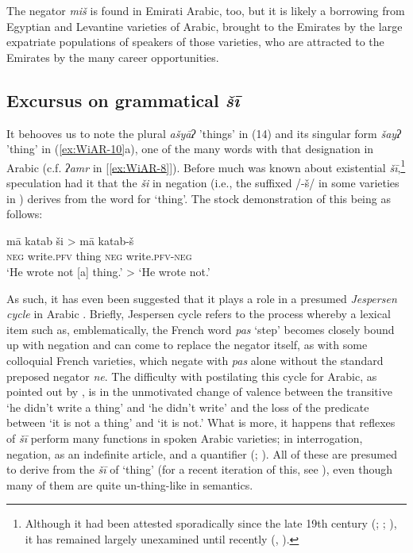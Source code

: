 \documentclass[output=paper,colorlinks,citecolor=brown]{langscibook}
\begin{document}
The negator \textit{miš} is found in Emirati Arabic, too, but it is likely a borrowing from Egyptian and Levantine varieties of Arabic, brought to the Emirates by the large expatriate populations of speakers of those varieties, who are attracted to the Emirates by the many career opportunities.

\subsection{Excursus on grammatical \textit{šī}} \label{s:WiAR-3.3}

It behooves us to note the plural \textit{ašyāʔ} ’things’ in (14) and its singular form \textit{šayʔ} ’thing’ in (\ref{ex:WiAR-10}a), one of the many words with that designation in Arabic (c.f. \textit{ʔamr} in [\ref{ex:WiAR-8}]). Before much was known about existential \textit{šī},\footnote{Although it had been attested sporadically since the late 19th century  (\citealp[112]{reinhardt1894a}; \citealp[170]{johnstone1967a}; \citealp[24]{brockett1985a}), it has remained largely unexamined until recently (\citealp[24--28]{holes2016a}, \citealp{wilmsen2017a, wilmsen2020a}).} speculation had it that the \textit{ši} in negation (i.e., the suffixed /-š/ in some varieties in ) derives from the word for ‘thing’. The stock demonstration of this being as follows:


\ea \label{ex:WiAR-17}
	\gll mā katab ši > mā katab-š\\
	\textsc{neg} write.\textsc{pfv} thing {} \textsc{neg} write.\textsc{pfv-neg}\\
	\glt ‘He wrote not [a] thing.’ > ‘He wrote not.’
\z

As such, it has even been suggested that it plays a role in a presumed \textit{Jespersen cycle} in Arabic \citep{lucas2007a}. Briefly, Jespersen cycle refers to the process whereby a lexical item such as, emblematically, the French word \textit{pas} ‘step’ becomes closely bound up with negation and can come to replace the negator itself, as with some colloquial French varieties, which negate with \textit{pas} alone without the standard preposed negator \textit{ne}. The difficulty with postilating this cycle for Arabic, as pointed out by \citet[139]{woidich1990a}, is in the unmotivated change of valence between the transitive ‘he didn’t write a thing’ and ‘he didn’t write’ and the loss of the predicate between ‘it is not a thing’ and ‘it is not.’ What is more, it happens that reflexes of \textit{šī} perform many functions in spoken Arabic varieties; in interrogation, negation, as an indefinite article, and a quantifier (\citealp[44--63]{wilmsen2014a}; \citealp{wilmsen2017a}). All of these are presumed to derive from the \textit{šī} of ‘thing’ (for a recent iteration of this, see \citealt{glanville2018a}), even though many of them are quite un-thing-like in semantics.
\end{document}

